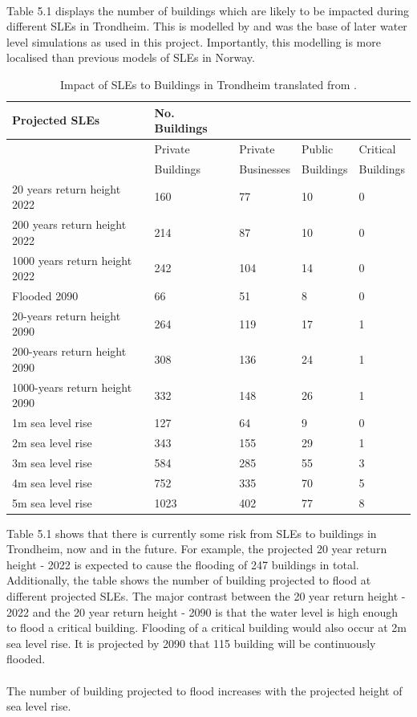 \paragraph{}
Table 5.1 displays the number of buildings which are likely to be impacted during different SLEs in Trondheim. This is modelled by \cite{kartverket_se_2021} and was the base of later water level simulations as used in this project. Importantly, this modelling is more localised than previous models of SLEs in Norway.

\begin{table}[H]
    \centering
    \begin{tabular}{|l|l|l|l|l|}
    \hline
        \textbf{Projected SLEs }& \textbf{No. Buildings}  & ~ & ~ & ~ \\ \hline
        ~ & Private & Private & Public  & Critical  \\ \newline
        ~ & Buildings & Businesses & Buildings & Buildings \\ \hline        
        20 years return height 2022 & 160 & 77 & 10 & 0 \\ \hline
        200 years return height 2022 & 214 & 87 & 10 & 0 \\ \hline
        1000 years return height 2022 & 242 & 104 & 14 & 0 \\ \hline
        Flooded 2090 & 66 & 51 & 8 & 0 \\ \hline
        20-years return height 2090 & 264 & 119 & 17 & 1 \\ \hline
        200-years return height  2090 & 308 & 136 & 24 & 1 \\ \hline
        1000-years return height  2090 & 332 & 148 & 26 & 1 \\ \hline
        1m sea level rise & 127 & 64 & 9 & 0 \\ \hline
        2m sea level rise & 343 & 155 & 29 & 1 \\ \hline
        3m sea level rise & 584 & 285 & 55 & 3 \\ \hline
        4m sea level rise & 752 & 335 & 70 & 5 \\ \hline
        5m sea level rise & 1023 & 402 & 77 & 8 \\ \hline
    \end{tabular}
    \caption{Impact of SLEs to Buildings in Trondheim translated from \cite{kartverket_se_2021}.  }
    \label{building-impact-sle}
\end{table}


Table 5.1 shows that there is currently some risk from SLEs to buildings in Trondheim, now and in the future. For example, the projected 20 year return height - 2022 is expected to cause the flooding of 247 buildings in total. Additionally, the table shows the number of building projected to flood at different projected SLEs. The major contrast between the 20 year return height - 2022 and the 20 year return height - 2090 is that the water level is high enough to flood a critical building. Flooding of a critical building would also occur at 2m sea level rise. It is projected by 2090 that 115 building will be continuously flooded.
\paragraph{}
The number of building projected to flood increases with the projected height of sea level rise. 
